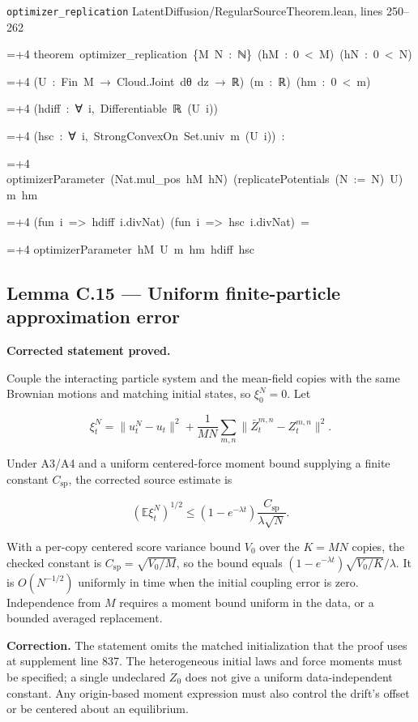 \documentclass[11pt,a4paper]{report}
\newlength{\leancharwidth}
\newenvironment{leancode}{\par\smallskip\begingroup\ttfamily\footnotesize\raggedright
  \settowidth{\leancharwidth}{M}\setlength{\parskip}{0pt}\setlength{\parindent}{0pt}
  \frenchspacing}{\par\endgroup\smallskip}
\newcommand{\leanline}[2]{\hangindent=\dimexpr#1\leancharwidth+4\leancharwidth\relax
  \hangafter=1\noindent\hspace*{#1\leancharwidth}#2\par}
\newcommand{\leansource}[1]{\par{\footnotesize\color{leanmuted}#1}\par}
\begin{document}
\begin{leanbox}
\leansource{\texttt{optimizer\_\allowbreak{}replication} \quad LatentDiffusion/\allowbreak{}RegularSourceTheorem.lean, lines 250–262}
\begin{leancode}
\leanline{0}{theorem\ optimizer\_replication\ \{M\ N\ :\ ℕ\}\ (hM\ :\ 0\ <\ M)\ (hN\ :\ 0\ <\ N)}
\leanline{4}{(U\ :\ Fin\ M\ →\ Cloud.Joint\ dθ\ dz\ →\ ℝ)\ (m\ :\ ℝ)\ (hm\ :\ 0\ <\ m)}
\leanline{4}{(hdiff\ :\ ∀\ i,\ Differentiable\ ℝ\ (U\ i))}
\leanline{4}{(hsc\ :\ ∀\ i,\ StrongConvexOn\ Set.univ\ m\ (U\ i))\ :}
\leanline{4}{optimizerParameter\ (Nat.mul\_pos\ hM\ hN)\ (replicatePotentials\ (N\ :=\ N)\ U)\ m\ hm}
\leanline{6}{(fun\ i\ =>\ hdiff\ i.divNat)\ (fun\ i\ =>\ hsc\ i.divNat)\ =}
\leanline{8}{optimizerParameter\ hM\ U\ m\ hm\ hdiff\ hsc}
\end{leancode}
\end{leanbox}
\subsection{\texorpdfstring{Lemma C.15 — Uniform finite-particle approximation error}{Lemma C.15 — Uniform finite-particle approximation error}}


\textbf{Corrected statement proved.}



Couple the interacting particle system and the
        mean-field copies with the same Brownian motions and matching initial
        states, so \(\xi_0^N=0\). Let


        \[\xi_t^N=\|u_t^N-u_t\|^2+
          \frac1{MN}\sum_{m,n}\|\bar Z_t^{m,n}-Z_t^{m,n}\|^2.\]


Under A3/\allowbreak{}A4 and a uniform centered-force moment bound supplying a
        finite constant \(C_{\mathrm{sp}}\), the corrected source estimate is


        \[(\mathbb E\xi_t^N)^{1/2}\le
          (1-e^{-\lambda t})\frac{C_{\mathrm{sp}}}{\lambda\sqrt N}.\]


With a per-copy centered score variance bound \(V_0\) over the
        \(K=MN\) copies, the checked constant is
        \(C_{\mathrm{sp}}=\sqrt{V_0/M}\), so the bound equals
        \((1-e^{-\lambda t})\sqrt{V_0/K}/\lambda\).
        It is \(O(N^{-1/2})\) uniformly in time when the initial coupling
        error is zero. Independence from \(M\) requires a moment bound uniform
        in the data, or a bounded averaged replacement.



\textbf{Correction.} The statement omits the matched initialization that the proof uses at supplement line 837. The heterogeneous initial laws and force moments must be specified; a single undeclared \(Z_0\) does not give a uniform data-independent constant. Any origin-based moment expression must also control the drift's offset or be centered about an equilibrium.
\end{document}

